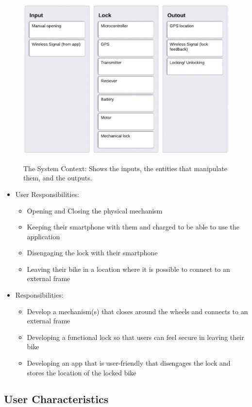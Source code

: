 \documentclass[12pt]{article}
\begin{document}
 \begin{figure}[h!]
 \begin{center}
 {
  \includegraphics[width=0.6\linewidth]{../SystemContextDiagram.jpeg}
 }
 \caption{\label{The System Context}The System Context: Shows the inputs, the entities that manipulate them, and the outputs.}
 \end{center}
 \end{figure}

\begin{itemize}
\item User Responsibilities:
\begin{itemize}
\item Opening and Closing the physical mechanism
\item Keeping their smartphone with them and charged to be able to use the application
\item Disengaging the lock with their smartphone
\item Leaving their bike in a location where it is possible to connect to an external frame
\end{itemize}
\item \progname{} Responsibilities:
\begin{itemize}
\item Develop a mechanism(s) that closes around the wheels and connects to an external frame
\item Developing a functional lock so that users can feel secure in leaving their bike
\item Developing an app that is user-friendly that disengages the lock and stores the location of the locked bike
\end{itemize}
\end{itemize}

\subsection{User Characteristics} \label{SecUserCharacteristics}
\end{document}

